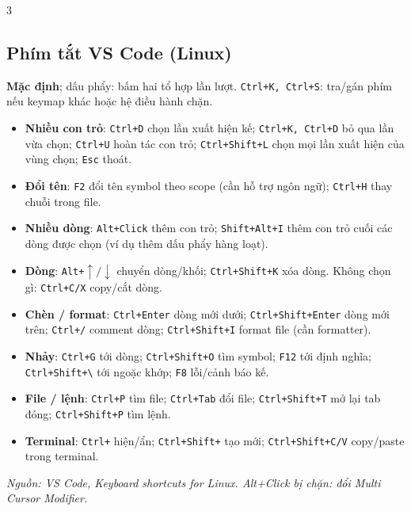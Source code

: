 \documentclass[landscape, 8pt, a4paper, oneside]{extarticle}
\begin{document}
\begin{multicols}{3}


\subsection{Phím tắt VS Code (Linux)}
\textbf{Mặc định}; dấu phẩy: bấm hai tổ hợp lần lượt. \texttt{Ctrl+K, Ctrl+S}: tra/gán phím nếu keymap khác hoặc hệ điều hành chặn.
\begin{itemize}
    \setlength{\itemsep}{0pt}
    \setlength{\parsep}{0pt}
    \item \textbf{Nhiều con trỏ}: \texttt{Ctrl+D} chọn lần xuất hiện kế; \texttt{Ctrl+K, Ctrl+D} bỏ qua lần vừa chọn; \texttt{Ctrl+U} hoàn tác con trỏ; \texttt{Ctrl+Shift+L} chọn mọi lần xuất hiện của vùng chọn; \texttt{Esc} thoát.
    \item \textbf{Đổi tên}: \texttt{F2} đổi tên symbol theo scope (cần hỗ trợ ngôn ngữ); \texttt{Ctrl+H} thay chuỗi trong file.
    \item \textbf{Nhiều dòng}: \texttt{Alt+Click} thêm con trỏ; \texttt{Shift+Alt+I} thêm con trỏ cuối các dòng được chọn (ví dụ thêm dấu phẩy hàng loạt).
    \item \textbf{Dòng}: \texttt{Alt+}$\uparrow/\downarrow$ chuyển dòng/khối; \texttt{Ctrl+Shift+K} xóa dòng. Không chọn gì: \texttt{Ctrl+C/X} copy/cắt dòng.
    \item \textbf{Chèn / format}: \texttt{Ctrl+Enter} dòng mới dưới; \texttt{Ctrl+Shift+Enter} dòng mới trên; \texttt{Ctrl+/} comment dòng; \texttt{Ctrl+Shift+I} format file (cần formatter).
    \item \textbf{Nhảy}: \texttt{Ctrl+G} tới dòng; \texttt{Ctrl+Shift+O} tìm symbol; \texttt{F12} tới định nghĩa; \texttt{Ctrl+Shift+\textbackslash} tới ngoặc khớp; \texttt{F8} lỗi/cảnh báo kế.
    \item \textbf{File / lệnh}: \texttt{Ctrl+P} tìm file; \texttt{Ctrl+Tab} đổi file; \texttt{Ctrl+Shift+T} mở lại tab đóng; \texttt{Ctrl+Shift+P} tìm lệnh.
    \item \textbf{Terminal}: \texttt{Ctrl+\textasciigrave} hiện/ẩn; \texttt{Ctrl+Shift+\textasciigrave} tạo mới; \texttt{Ctrl+Shift+C/V} copy/paste trong terminal.
\end{itemize}
\textit{Nguồn: VS Code, Keyboard shortcuts for Linux. Alt+Click bị chặn: đổi Multi Cursor Modifier.}


\end{multicols}
\end{document}
